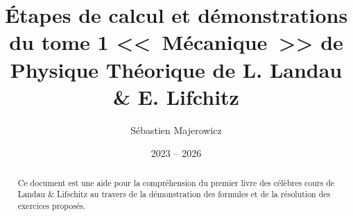 \documentclass[12pt,a4paper]{report}
\title{\'Etapes de calcul et d\'emonstrations du tome 1 <<~M\'ecanique~>>  de Physique Th\'eorique de L. Landau \&  E. Lifchitz}
\author{S\'ebastien Majerowicz}
\date{2023 -- 2026}
\begin{document}
\maketitle

\begin{abstract}
Ce document est une aide pour la compr\'ehension du premier livre des c\'el\`ebres cours de Landau \& Lifschitz au travers de la d\'emonstration des formules et de la r\'esolution des exercices propos\'es.
\end{abstract}

\tableofcontents
\listoffigures

\clearpage
{}
\setcounter{page}{1}









\appendix








\end{document}
